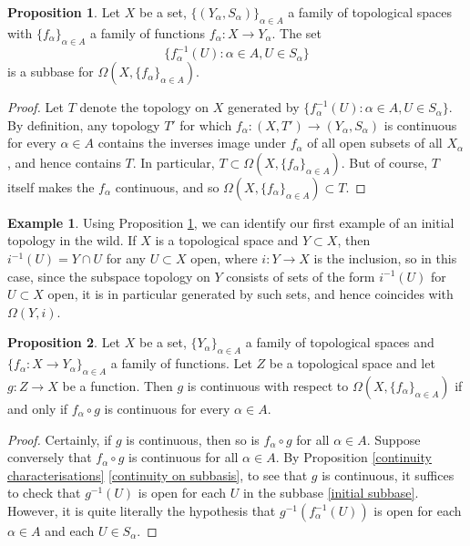 \documentclass{book}
\theoremstyle{definition}
\newtheorem{proposition}{Proposition}[section]
\newtheorem{example}{Example}[section]
\theoremstyle{remark}
\newcommand{\initial}[2]{\Omega(#1, #2)}
\begin{document}
\begin{proposition}\label{initial subbase proposition}
    Let $X$ be a set, $\{(Y_\alpha, S_\alpha)\}_{\alpha\in A}$ a family of topological spaces with $\{f_\alpha\}_{\alpha\in A}$ a family of functions $f_\alpha:X\to Y_\alpha$. The set
    \begin{equation}\label{initial subbase}
        \{f_\alpha^{-1}(U):\alpha\in A,U\in S_\alpha\}
    \end{equation}
    is a subbase for $\initial{X}{\{f_\alpha\}_{\alpha\in A}}$.
\end{proposition}
\begin{proof}
    Let $T$ denote the topology on $X$ generated by $\{f_\alpha^{-1}(U):\alpha\in A,U\in S_\alpha\}$. By definition, any topology $T'$ for which $f_\alpha:(X, T')\to (Y_\alpha, S_\alpha)$ is continuous for every $\alpha\in A$ contains the inverses image under $f_\alpha$ of all open subsets of all $X_\alpha$, and hence contains $T$. In particular, $T\subset \initial{X}{\{f_\alpha\}_{\alpha\in A}}$. But of course, $T$ itself makes the $f_\alpha$ continuous, and so $\initial{X}{\{f_\alpha\}_{\alpha\in A}}\subset T$.
\end{proof}

\begin{example}
    Using Proposition \ref{initial subbase proposition}, we can identify our first example of an initial topology in the wild. If $X$ is a topological space and $Y\subset X$, then $i^{-1}(U)=Y\cap U$ for any $U\subset X$ open, where $i:Y\to X$ is the inclusion, so in this case, since the subspace topology on $Y$ consists of sets of the form $i^{-1}(U)$ for $U\subset X$ open, it is in particular generated by such sets, and hence coincides with $\initial{Y}{i}$.
\end{example}

\begin{proposition}
\label{initialcont}
Let $X$ be a set, $\{Y_\alpha\}_{\alpha\in A}$ a family of topological spaces and $\{f_\alpha:X\to Y_\alpha\}_{\alpha\in A}$ a family of functions. Let $Z$ be a topological space and let $g:Z\to X$ be a function. Then $g$ is continuous with respect to $\initial{X}{\{f_\alpha\}_{\alpha\in A}}$ if and only if $f_\alpha\circ g$ is continuous for every $\alpha\in A$.
\end{proposition}
\begin{proof}
    Certainly, if $g$ is continuous, then so is $f_\alpha\circ g$ for all $\alpha\in A$. Suppose conversely that $f_\alpha\circ g$ is continuous for all $\alpha\in A$. By Proposition \ref{continuity characterisations} \eqref{continuity on subbasis}, to see that $g$ is continuous, it suffices to check that $g^{-1}(U)$ is open for each $U$ in the subbase \eqref{initial subbase}. However, it is quite literally the hypothesis that $g^{-1}(f_\alpha^{-1}(U))$ is open for each $\alpha\in A$ and each $U\in S_\alpha$. 
\end{proof}
\end{document}
